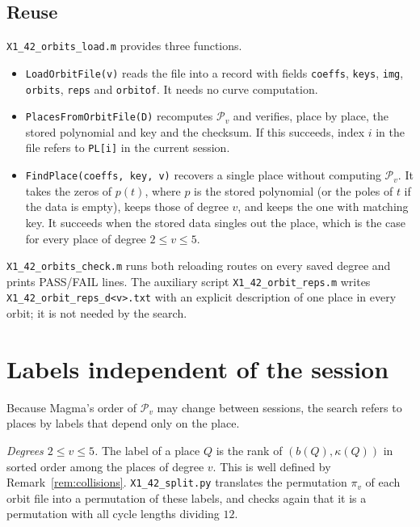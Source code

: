 \documentclass[11pt]{amsart}
\theoremstyle{definition}
\theoremstyle{remark}
\newcommand{\Pl}{\mathcal{P}}
\newcommand{\code}[1]{\texttt{#1}}
\begin{document}
\subsection{Reuse}
\code{X1\_42\_orbits\_load.m} provides three functions.
\begin{itemize}
\item \code{LoadOrbitFile(v)} reads the file into a record with fields \code{coeffs}, \code{keys}, \code{img}, \code{orbits}, \code{reps} and \code{orbitof}. It needs no curve computation.
\item \code{PlacesFromOrbitFile(D)} recomputes $\Pl_v$ and verifies, place by place, the stored polynomial and key and the checksum. If this succeeds, index $i$ in the file refers to \code{PL[i]} in the current session.
\item \code{FindPlace(coeffs, key, v)} recovers a single place without computing $\Pl_v$. It takes the zeros of $p(t)$, where $p$ is the stored polynomial (or the poles of $t$ if the data is empty), keeps those of degree $v$, and keeps the one with matching key. It succeeds when the stored data singles out the place, which is the case for every place of degree $2\le v\le5$.
\end{itemize}
\code{X1\_42\_orbits\_check.m} runs both reloading routes on every saved degree and prints PASS/FAIL lines. The auxiliary script \code{X1\_42\_orbit\_reps.m} writes \code{X1\_42\_orbit\_reps\_d<v>.txt} with an explicit description of one place in every orbit; it is not needed by the search.

\section{Labels independent of the session}\label{sec:labels}

Because Magma's order of $\Pl_v$ may change between sessions, the search refers to places by labels that depend only on the place.

\emph{Degrees $2\le v\le5$.} The label of a place $Q$ is the rank of $(b(Q),\kappa(Q))$ in sorted order among the places of degree $v$. This is well defined by Remark~\ref{rem:collisions}. \code{X1\_42\_split.py} translates the permutation $\pi_v$ of each orbit file into a permutation of these labels, and checks again that it is a permutation with all cycle lengths dividing $12$.
\end{document}
